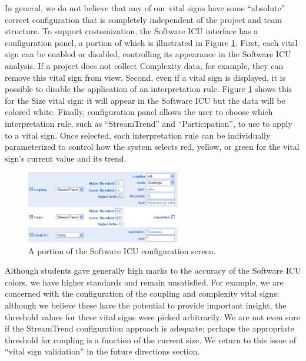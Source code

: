 \documentclass[times,10pt,twocolumn]{article}
\begin{document}
In general, we do not believe that any of our vital signs have some
``absolute'' correct configuration that is completely independent of the project and
team structure.  To support customization, the Software ICU interface has a
configuration panel, a portion of which is illustrated in Figure
\ref{fig:configuration}.  First, each vital sign can be enabled or
disabled, controlling its appearance in the Software ICU analysis. If a
project does not collect Complexity data, for example, they can remove this
vital sign from view.  Second, even if a vital sign is displayed, it is
possible to disable the application of an interpretation rule.  Figure
\ref{fig:configuration} shows this for the Size vital sign: it will appear
in the Software ICU but the data will be colored white.  Finally,
configuration panel allows the user to choose which interpretation rule,
such as ``StreamTrend'' and ``Participation'', to use to apply to a vital
sign. Once selected, each interpretation rule can be individually
parameterized to control how the system selects red, yellow, or green for
the vital sign's current value and its trend.

\begin{figure}[ht]
  \center
  \includegraphics[width=0.6\textwidth]{configuration.eps}
  \caption{A portion of the Software ICU configuration screen.}
  \label{fig:configuration}
\end{figure} 

Although students gave generally high marks to the accuracy of the Software
ICU colors, we have higher standards and remain unsatisfied.  For example,
we are concerned with the configuration of the coupling and complexity
vital signs: although we believe these have the potential to provide
important insight, the threshold values for these vital signs were picked
arbitrarily.  We are not even sure if the StreamTrend configuration
approach is adequate; perhaps the appropriate threshold for coupling is a
function of the current size. We return to this issue of ``vital sign validation'' in the
future directions section.

\end{document}
